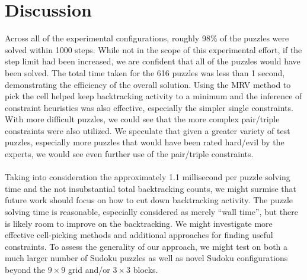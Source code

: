 \documentclass{article}
\begin{document}
\section{Discussion}
Across all of the experimental configurations, roughly 98\% of the puzzles were solved within 1000 steps. While not in the scope of this experimental effort, if the step limit had been increased, we are confident that all of the puzzles would have been solved. The total time taken for the 616 puzzles was less than 1 second, demonstrating the efficiency of the overall solution. Using the MRV method to pick the cell helped keep backtracking activity to a minimum and the inference of constraint heuristics was also effective, especially the simpler single constraints. With more difficult puzzles, we could see that the more complex pair/triple constraints were also utilized. We speculate that given a greater variety of test puzzles, especially more puzzles that would have been rated hard/evil by the experts, we would see even further use of the pair/triple constraints.\\
\\
Taking into consideration the approximately 1.1 millisecond per puzzle solving time and the not insubstantial total backtracking counts, we might surmise that future work should focus on how to cut down backtracking activity. The puzzle solving time is reasonable, especially considered as merely \enquote{wall time}, but there is likely room to improve on the backtracking. We might investigate more effective cell-picking methods and additional approaches for finding useful constraints. To assess the generality of our approach, we might test on both a much larger number of Sudoku puzzles as well as novel Sudoku configurations beyond the $9 \times 9$ grid and/or $3 \times 3$ blocks.
\end{document}
